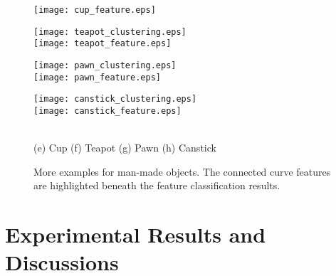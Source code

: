 \documentclass[10pt,journal,cspaper,compsoc]{IEEEtran}
\begin{document}
\begin{figure*}
\begin{minipage}{0.2\textwidth}
\vspace{30pt}
\texttt{[image: cup\_feature.eps]}\\
\end{minipage} \hspace{10pt}
\begin{minipage}{0.3\textwidth}
\centering
\vspace{30pt}
\texttt{[image: teapot\_clustering.eps]}\\
\vspace{40pt}
\texttt{[image: teapot\_feature.eps]}\\
\end{minipage} \hspace{10pt}
\begin{minipage}{0.13\textwidth}
\centering
\texttt{[image: pawn\_clustering.eps]}\\
\vspace{40pt}
\texttt{[image: pawn\_feature.eps]}\\
\end{minipage} \hspace{10pt}
\begin{minipage}{0.12\textwidth}
\centering
\texttt{[image: canstick\_clustering.eps]}\\
\vspace{20pt}
\texttt{[image: canstick\_feature.eps]}\\
\end{minipage}\\ \vspace{4pt}
\hspace{0.05\textwidth} (e) Cup  \hspace{0.19\textwidth} (f) Teapot  \hspace{0.16\textwidth}  (g) Pawn  \hspace{0.04\textwidth} (h) Canstick\\
    \caption{More examples for man-made objects.
    The connected curve features are highlighted beneath
    the feature classification results.}
    \label{fig:others}
\end{figure*}


\section{Experimental Results and Discussions}
\label{sec:ERD}
\end{document}
